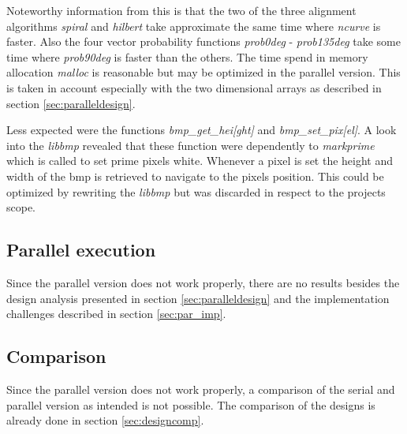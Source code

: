 Noteworthy information from this is that the two of the three alignment algorithms \emph{spiral} and \emph{hilbert} take approximate the same time where \emph{ncurve} is faster. Also the four vector probability functions \emph{prob0deg} - \emph{prob135deg} take some time where \emph{prob90deg} is faster than the others. The time spend in memory allocation \emph{malloc} is reasonable but may be optimized in the parallel version. This is taken in account especially with the two dimensional arrays as described in section \ref{sec:paralleldesign}.

Less expected were the functions \emph{bmp\_get\_hei[ght]} and \emph{bmp\_set\_pix[el]}. A look into the \emph{libbmp} revealed that these function were dependently to \emph{markprime} which is called to set prime pixels white. Whenever a pixel is set the height and width of the bmp is retrieved to navigate to the pixels position. This could be optimized by rewriting the \emph{libbmp} but was discarded in respect to the projects scope.

\subsection{Parallel execution}
\label{sec:par_ex}
Since the parallel version does not work properly, there are no results besides the design analysis presented in section \ref{sec:paralleldesign} and the implementation challenges described in section \ref{sec:par_imp}.

\subsection{Comparison}
Since the parallel version does not work properly, a comparison of the serial and parallel version as intended is not possible. The comparison of the designs is already done in section \ref{sec:designcomp}.





